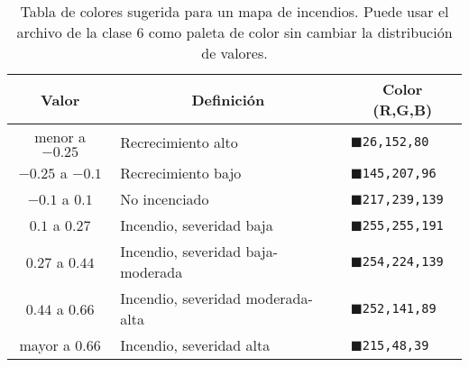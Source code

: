 \begin{enumerate}
\begin{table}[]
\centering
\begin{tabular}{@{}cll@{}}
\toprule
Valor              & \multicolumn{1}{c}{Definición}       & \multicolumn{1}{c}{Color (R,G,B)}                        \\ \midrule
menor a $-0.25$    & Recrecimiento alto                   & \textcolor{NB1}{$\blacksquare$}\texttt{26,152,80} \\
$-0.25$ a $-0.1$   & Recrecimiento bajo   		  & \textcolor{NB2}{$\blacksquare$}\texttt{145,207,96} \\
$-0.1$ a $0.1$     & No incenciado     		 	  & \textcolor{NB3}{$\blacksquare$}\texttt{217,239,139} \\
$0.1$ a $0.27$     & Incendio, severidad baja		  & \textcolor{NB4}{$\blacksquare$}\texttt{255,255,191} \\
$0.27$ a $0.44$    & Incendio, severidad baja-moderada    & \textcolor{NB5}{$\blacksquare$}\texttt{254,224,139} \\
$0.44$ a $0.66$    & Incendio, severidad moderada-alta    & \textcolor{NB6}{$\blacksquare$}\texttt{252,141,89} \\
mayor a $0.66$     & Incendio, severidad alta             & \textcolor{NB7}{$\blacksquare$}\texttt{215,48,39} \\ \bottomrule
\end{tabular}
\caption{Tabla de colores sugerida para un mapa de incendios. Puede usar el archivo  de la clase 6 como paleta de color sin cambiar la distribución de valores.}
\label{tab:inc}
\end{table}
\end{enumerate}
%
%
%
%
